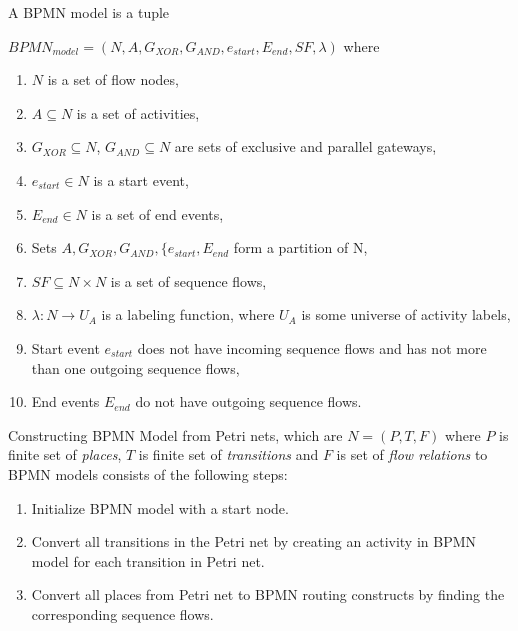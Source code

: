 \theoremstyle{definition}
\begin{definition}
A BPMN model is a tuple 

$BPMN_{model}=(N, A, G_{XOR}, G_{AND}, e_{start}, E_{end}, SF, \lambda)$ where
\begin{enumerate}
  \item $N$ is a set of flow nodes,
  \item $A \subseteq N$ is a set of activities,
  \item $G_{XOR} \subseteq N$, $G_{AND} \subseteq N$ are sets of exclusive and parallel gateways,
  \item $e_{start} \in N$ is a start event,
  \item $E_{end} \in N$ is a set of end events,
  \item Sets $A, G_{XOR}, G_{AND}, \{e_{start}, E_{end}$ form a partition of N,
  \item $SF \subseteq N \times N$ is a set of sequence flows,
  \item $\lambda : N \rightarrow U_{A}$ is a labeling function, where $U_{A}$ is some universe of activity labels,
  \item Start event $e_{start}$ does not have incoming sequence flows and has not more than one outgoing sequence flows,
  \item End events $E_{end}$ do not have outgoing sequence flows.  
\end{enumerate}
\end{definition}

\theoremstyle{definition}
\begin{definition}
Constructing BPMN Model from Petri nets, which are $N = (P, T, F)$ where $P$ is finite set of \textit{places}, $T$ is finite set of \textit{transitions} and $F$ is set of \textit{flow relations} to BPMN models consists of the following steps:
\begin{enumerate}
  \item Initialize BPMN model with a start node.
  \item Convert all transitions in the Petri net by creating an activity in BPMN model for each transition in Petri net.
  \item Convert all places from Petri net to BPMN routing constructs by finding the corresponding sequence flows.
\end{enumerate}
\end{definition}

